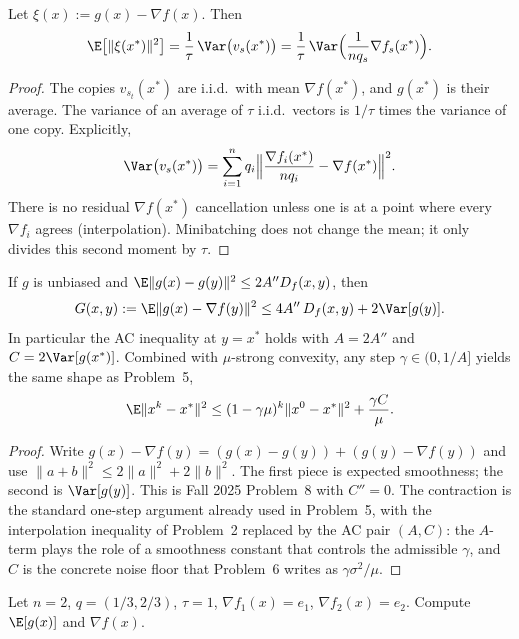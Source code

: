 \begin{proposition}
\label{prop:optu-var-opt}
Let $\xi(x):=g(x)-\nabla f(x)$. Then
\[
\E\bigl[\|\xi(x^*)\|^2\bigr]
=
\frac1\tau\,\Var\bigl(v_s(x^*)\bigr)
=
\frac1\tau\,\Var\Bigl(\frac1{n q_s}\nabla f_s(x^*)\Bigr).
\]
\end{proposition}

\begin{proof}
The copies $v_{s_t}(x^*)$ are i.i.d.\ with mean $\nabla f(x^*)$, and $g(x^*)$ is their average. The variance of an average of $\tau$ i.i.d.\ vectors is $1/\tau$ times the variance of one copy. Explicitly,
\[
\Var\bigl(v_s(x^*)\bigr)
=
\sum_{i=1}^n q_i\Bigl\|\frac{\nabla f_i(x^*)}{n q_i}-\nabla f(x^*)\Bigr\|^2.
\]
There is no residual $\nabla f(x^*)$ cancellation unless one is at a point where every $\nabla f_i$ agrees (interpolation). Minibatching does not change the mean; it only divides this second moment by $\tau$.
\end{proof}

\begin{proposition}
\label{prop:optu-ac}
If $g$ is unbiased and $\E\|g(x)-g(y)\|^2\le 2A'' D_f(x,y)$, then
\[
G(x,y)
:=
\E\|g(x)-\nabla f(y)\|^2
\le
4A''\, D_f(x,y)+2\Var[g(y)].
\]
In particular the AC inequality at $y=x^*$ holds with $A=2A''$ and $C=2\Var[g(x^*)]$. Combined with $\mu$-strong convexity, any step $\gamma\in(0,1/A]$ yields the same shape as Problem~5,
\[
\E\|x^k-x^*\|^2
\le
(1-\gamma\mu)^k\|x^0-x^*\|^2+\frac{\gamma C}{\mu}.
\]
\end{proposition}

\begin{proof}
Write $g(x)-\nabla f(y)=(g(x)-g(y))+(g(y)-\nabla f(y))$ and use $\|a+b\|^2\le 2\|a\|^2+2\|b\|^2$. The first piece is expected smoothness; the second is $\Var[g(y)]$. This is Fall 2025 Problem~8 with $C''=0$. The contraction is the standard one-step argument already used in Problem~5, with the interpolation inequality of Problem~2 replaced by the AC pair $(A,C)$: the $A$-term plays the role of a smoothness constant that controls the admissible $\gamma$, and $C$ is the concrete noise floor that Problem~6 writes as $\gamma\sigma^2/\mu$.
\end{proof}

\begin{exercise}[Check unbiasedness on $n=2$]
\label{ex:optu-unbiased}
Let $n=2$, $q=(1/3,2/3)$, $\tau=1$, $\nabla f_1(x)=e_1$, $\nabla f_2(x)=e_2$. Compute $\E[g(x)]$ and $\nabla f(x)$.
\end{exercise}


